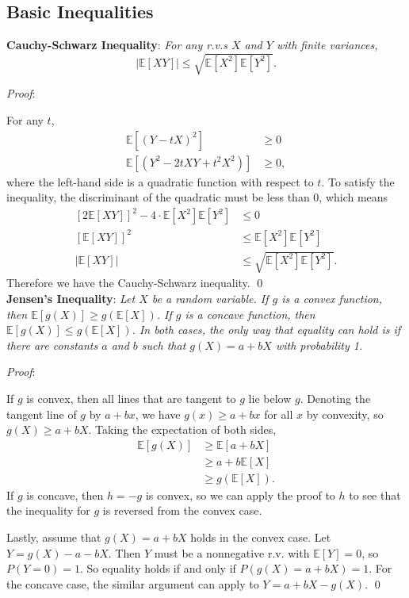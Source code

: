 \documentclass{progartcn}
\begin{document}
	\subsection{Basic Inequalities}

		\textbf{Cauchy-Schwarz Inequality}: \textit{For any r.v.s $X$ and $Y$ with finite variances,}
		\[|\mathbb{E}[XY]|\le \sqrt{\mathbb{E}[X^2]\mathbb{E}[Y^2]}.\]

		\textit{Proof}:

		For any $t$,
		\[\begin{split}
		\mathbb{E}[(Y-tX)^2]&\ge 0\\
		\mathbb{E}[(Y^2-2tXY+t^2X^2)]&\ge 0,
		\end{split}
		\]
		where the left-hand side is a quadratic function with respect to $t$. To satisfy the inequality, the discriminant of the quadratic must be less than 0, which means
		\[\begin{split}
		[2\mathbb{E}[XY]]^2-4\cdot \mathbb{E}[X^2]\mathbb{E}[Y^2]&\le 0\\
		[\mathbb{E}[XY]]^2&\le \mathbb{E}[X^2]\mathbb{E}[Y^2]\\
		|\mathbb{E}[XY]|&\le \sqrt{\mathbb{E}[X^2]\mathbb{E}[Y^2]}.
		\end{split}
		\]
		Therefore we have the Cauchy-Schwarz inequality.
		\qed\\

		\textbf{Jensen's Inequality}: \textit{Let $X$ be a random variable. If $g$ is a convex function, then $\mathbb{E}[g(X)]\ge g(\mathbb{E}[X])$. If $g$ is a concave function, then $\mathbb{E}[g(X)]\le g(\mathbb{E}[X])$. In both cases, the only way that equality can hold is if there are constants $a$ and $b$ such that $g(X)=a+bX$ with probability 1.}

		\textit{Proof}:

		If $g$ is convex, then all lines that are tangent to $g$ lie below $g$. Denoting the tangent line of $g$ by $a+bx$, we have $g(x)\ge a+bx$ for all $x$ by convexity, so $g(X)\ge a+bX$. Taking the expectation of both sides,
		\[\begin{split}
		\mathbb{E}[g(X)]&\ge \mathbb{E}[a+bX]\\
		&\ge a+b\mathbb{E}[X]\\
		&\ge g(\mathbb{E}[X]).
		\end{split}
		\]
		If $g$ is concave, then $h=-g$ is convex, so we can apply the proof to $h$ to see that the inequality for $g$ is reversed from the convex case.

		Lastly, assume that $g(X)=a+bX$ holds in the convex case. Let $Y=g(X)-a-bX$. Then $Y$ must be a nonnegative r.v. with $\mathbb{E}[Y]=0$, so $P(Y=0)=1$. So equality holds if and only if $P(g(X)=a+bX)=1$. For the concave case, the similar argument can apply to $Y=a+bX-g(X)$.
		\qed\\
\end{document}
